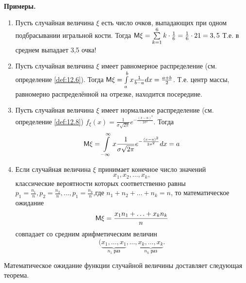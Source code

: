 \textbf{Примеры.}
	\begin{enumerate}
		\item Пусть случайная величина $\xi$ есть число очков, выпадающих при одном подбрасывании игральной кости. Тогда $\mathsf{M}\xi=\sum\limits_{k=1}^6k\cdot\frac{1}{6}=\frac{1}{6}\cdot21=3,5$ Т.е. в среднем выпадает 3,5 очка!

		\item Пусть случайная величина $\xi$ имеет равномерное распределение (см.
		определение \ref{def:12.6}). Тогда $\mathsf{M}\xi=\int\limits_a^b x\frac{1}{b-a}dx=\frac{a+b}{2}$. Т.е. центр массы, равномерно распределённой на отрезке, находится посередине.

		\item Пусть случайная величина $\xi$ имеет нормальное распределение (см.
		определение \ref{def:12.8}) $f_{\xi}(x)=\frac{1}{\sigma\sqrt{2\pi}}e^{-\frac{(x-a)^2}{2\sigma^2}}$. Тогда
			\begin{equation*}
				\mathsf{M}\xi=\int\limits_{-\infty}^{\infty} 
				x\frac{1}{\sigma\sqrt{2\pi}}
				e^{-\frac{(x-a)^2}{2\sigma^2}}dx=a
			\end{equation*}

		\item Если случайная величина $\xi$ принимает конечное число значений $$x_1,x_2,\ldots, x_k,$$ классические вероятности которых соответственно равны $p_1 =\frac{n_1}{n},p_2 =\frac{n_2}{n},\ldots,p_1 =\frac{n_k}{n}$,где $n_1 + n_2 + \ldots + n_k = n$, то математическое ожидание
		\begin{equation*}
			\mathsf{M} \xi=\frac{x_1n_1+\ldots+x_kn_k}{n}
		\end{equation*}
		совпадает со средним арифметическим величин 
		$$(\underbrace{x_1,\ldots , x_1}_{n_1 \text{ раз}},\ldots,\underbrace{x_k,\ldots,x_k}_{n_k \text{ раз}}.$$
	\end{enumerate}


Математическое ожидание функции случайной величины доставляет
следующая теорема.

